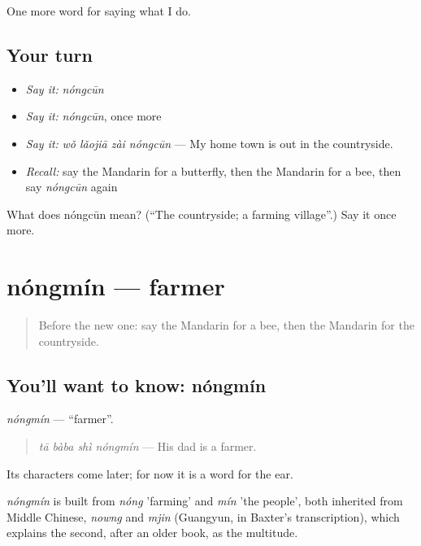 \begin{grammarlens}[title={What you've built}]
One more word for saying what I do.
\end{grammarlens}

\subsection*{Your turn}
\begin{itemize}
\raggedright
  \item \emph{Say it:} \emph{nóngcūn}
  \item \emph{Say it:} \emph{nóngcūn}, once more
  \item \emph{Say it:} \emph{wǒ lǎojiā zài nóngcūn} — My home town is out in the countryside.
  \item \emph{Recall:} say the Mandarin for a butterfly, then the Mandarin for a bee, then say \emph{nóngcūn} again
\end{itemize}

\begin{tcolorbox}[breakable,colback=teal!4,colframe=teal!35!black,title={Before you move on}]
What does nóngcūn mean? (\textquotedblleft{}The countryside; a farming village\textquotedblright{}.) Say it once more.
\end{tcolorbox}
\section[nóngmín]{nóngmín — farmer}

\label{lesson:ZH-C225-nongmin}



\begin{quote}
Before the new one: say the Mandarin for a bee, then the Mandarin for the countryside.
\end{quote}

\subsection*{You'll want to know: nóngmín}
\emph{nóngmín} — \textquotedblleft{}farmer\textquotedblright{}.

\begin{quote}
\emph{tā bàba shì nóngmín} — His dad is a farmer.
\end{quote}

Its characters come later; for now it is a word for the ear.

\begin{cousinweb}
\emph{nóngmín} is built from \emph{nóng} 'farming' and \emph{mín} 'the people', both inherited from Middle Chinese, \emph{nowng} and \emph{mjin} (Guangyun, in Baxter's transcription), which explains the second, after an older book, as the multitude.
\end{cousinweb}

